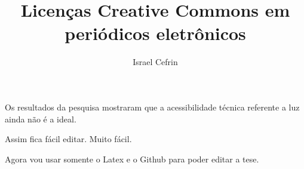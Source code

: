 \documentclass[11pt, oneside]{article}   	%
\title{Licenças Creative Commons em periódicos eletrônicos}
\author{Israel Cefrin}
\date{\displaydate{date}}
\begin{document}
\maketitle

Os resultados da pesquisa mostraram que a acessibilidade técnica referente a luz ainda não é a ideal.

Assim fica fácil editar.
Muito fácil.

Agora vou usar somente o Latex e o Github para poder editar a tese.
\end{document}
